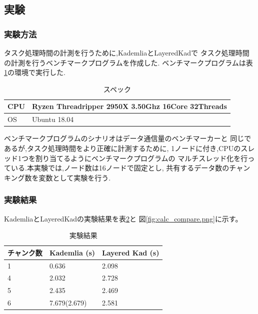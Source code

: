 \documentclass[sotsuron]{jcsie}
\begin{document}
\subsection{実験}
\subsubsection{実験方法}
タスク処理時間の計測を行うために,KademliaとLayeredKadで
タスク処理時間の計測を行うベンチマークプログラムを作成した.
ベンチマークプログラムは表\ref{table:spec-ryzen}の環境で実行した.

\begin{table}[H]
	\caption{スペック}	
	\centering
	\label{table:spec-ryzen}
	\begin{tabular}{|l|l|}
		\hline
		CPU &   
		Ryzen Threadripper 2950X 3.50Ghz 16Core 32Threads \\ 
		\hline	
		OS  &   
		Ubuntu 18.04 \\ 
		\hline
	\end{tabular}	
\end{table}

ベンチマークプログラムのシナリオはデータ通信量のベンチマーカーと
同じであるが,タスク処理時間をより正確に計測するために,
1ノードに付き,CPUのスレッド1つを割り当てるようにベンチマークプログラムの
マルチスレッド化を行っている.本実験では,ノード数は16ノードで固定とし,
共有するデータ数のチャンキング数を変数として実験を行う.

\subsubsection{実験結果}
KademliaとLayeredKadの実験結果を表\ref{table:calc-result}と
図\ref{fig:calc_compare.png}に示す。

\begin{table}[H]
	\caption{実験結果}
	\centering
	\label{table:calc-result}
	\begin{tabular}{|l|l|l|}
		\hline
		チャンク数 &   
		Kademlia (s)    &   
		Layered Kad (s)\\ 
		\hline
		1               &   
		0.636           &   
		2.098\\
		\hline
		4               &   
		2.032           &   
		2.728\\
		\hline
		5               &   
		2.435           &   
		2.469\\
		\hline
		6               &   
		7.679(2.679)    &   
		2.581\\
		\hline
	\end{tabular}
\end{table}
\end{document}
